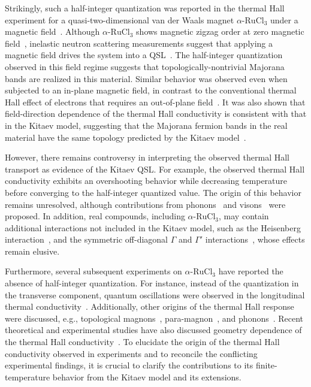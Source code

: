 \documentclass[twocolumn,superscriptaddress,showpacs, longbibliography, aps, prx]{revtex4-2}
\begin{document}
Strikingly, such a half-integer quantization was reported in the thermal Hall experiment for a quasi-two-dimensional van der Waals magnet $\alpha$-$\mathrm{RuCl_3}$ under a magnetic field~\cite{Kasahara_Nature2018}. 
Although $\alpha$-$\mathrm{RuCl_3}$ shows magnetic zigzag order at zero magnetic field~{\cite{Sears_PRB2015,Williams_PRB2015,Cao_PRB2016}}, inelastic neutron scattering measurements suggest that applying a magnetic field drives the system into a QSL~\cite{Banerjee_npjQ2018}. 
The half-integer quantization observed in this field regime suggests that topologically-nontrivial Majorana bands are realized in this material. 
Similar behavior was observed even when subjected to an in-plane magnetic field, in contrast to the conventional thermal Hall effect of electrons that requires an out-of-plane field~\cite{Yamashita_PRB2020,Bruin_NPhys2022}. 
It was also shown that field-direction dependence of the thermal Hall conductivity is consistent with that in the Kitaev model, suggesting that the Majorana fermion bands in the real material have the same topology predicted by the Kitaev model~\cite{Yokoi_Science2021}.

However, there remains controversy in interpreting the observed thermal Hall transport as evidence of the Kitaev QSL. 
For example, the observed thermal Hall conductivity exhibits an overshooting behavior while decreasing temperature before converging to the half-integer quantized value. 
The origin of this behavior remains unresolved, although contributions from phonons~\cite{Ye2018Quantization,Vinkler2018} and visons~\cite{Joy2022} were proposed. 
In addition, real compounds, including $\alpha$-$\mathrm{RuCl_3}$, may contain additional interactions not included in the Kitaev model, such as the Heisenberg interaction~\cite{Chaloupka_PRL2010,Chaloupka_PRL2013}, and the symmetric off-diagonal $\Gamma$ and $\Gamma'$ interactions~\cite{Rau2014,Rau2014pre,Winter2016}, whose effects remain elusive. 

Furthermore, several subsequent experiments on $\alpha$-$\mathrm{RuCl_3}$ have reported the absence of half-integer quantization. 
For instance, instead of the quantization in the transverse component, quantum oscillations were observed in the longitudinal thermal conductivity~\cite{Czajka_NPhy2021}. 
Additionally, other origins of the thermal Hall response were discussed, e.g., topological magnons~\cite{Czajka_NMat2023,ChernZK2021,ZhangCK2021, McClartyDGRPMP2018,Joshi2018}, para-magnon~\cite{Hentrich_PRB2019}, and phonons~\cite{Lefra_PRX2022, OhN2025}. 
Recent theoretical and experimental studies have also discussed geometry dependence of the thermal Hall conductivity~\cite{Halasz2025,ZhangHGJWTMY2025}.
To elucidate the origin of the thermal Hall conductivity observed in experiments and to reconcile the conflicting experimental findings, it is crucial to clarify the contributions to its finite-temperature behavior from the Kitaev model and its extensions.
\end{document}
